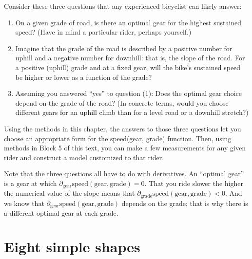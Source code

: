 \documentclass[
  letterpaper,
  DIV=11,
  numbers=noendperiod,
  oneside]{scrreprt}
\providecommand{\tightlist}{%
  \setlength{\itemsep}{0pt}\setlength{\parskip}{0pt}}
\begin{document}
Consider these three questions that any experienced bicyclist can likely
answer:

\begin{enumerate}
\def\labelenumi{\arabic{enumi}.}
\tightlist
\item
  On a given grade of road, is there an optimal gear for the highest
  sustained speed? (Have in mind a particular rider, perhaps yourself.)
\item
  Imagine that the grade of the road is described by a positive number
  for uphill and a negative number for downhill: that is, the slope of
  the road. For a positive (uphill) grade and at a fixed gear, will the
  bike's sustained speed be higher or lower as a function of the
  grade?
\item
  Assuming you answered ``yes'' to question (1): Does the optimal gear
  choice depend on the grade of the road? (In concrete terms, would you
  choose different gears for an uphill climb than for a level road or a
  downhill stretch?)
\end{enumerate}

Using the methods in this chapter, the answers to those three questions
let you choose an appropriate form for the speed(gear, grade) function.
Then, using methods in Block 5 of this text, you can make a few
measurements for any given rider and construct a model customized to
that rider.

Note that the three questions all have to do with derivatives. An
``optimal gear'' is a gear at which
\(\partial_\text{gear} \text{speed}(\text{gear}, \text{grade}) = 0\).
That you ride slower the higher the numerical value of the slope means
that
\(\partial_\text{grade} \text{speed}(\text{gear}, \text{grade}) < 0\).
And we know that
\(\partial_\text{gear} \text{speed}(\text{gear}, \text{grade})\) depends
on the grade; that is why there is a different optimal gear at each
grade.

\hypertarget{eight-simple-shapes}{%
\section{Eight simple shapes}\label{eight-simple-shapes}}
\end{document}
